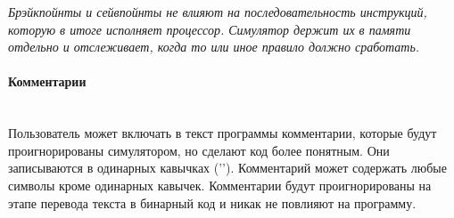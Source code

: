 { \it \large
Брэйкпойнты и сейвпойнты не влияют на последовательность инструкций, которую в итоге исполняет процессор. Симулятор держит их в памяти отдельно и отслеживает, когда то или иное правило должно сработать. \\
}
\paragraph{Комментарии}~\\
Пользователь может включать в текст программы комментарии, которые будут проигнорированы симулятором, но сделают код более понятным. Они записываются в одинарных кавычках ('\space'). Комментарий может содержать любые символы кроме одинарных кавычек.
Комментарии будут проигнорированы на этапе перевода текста в бинарный код и никак не повлияют на программу.


